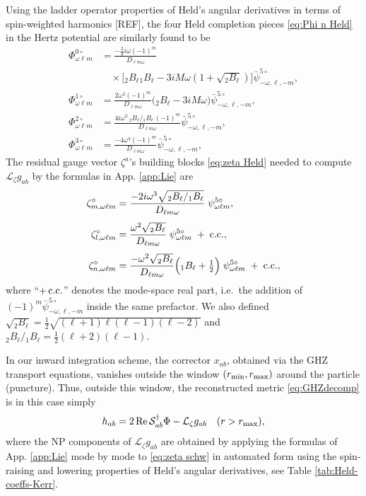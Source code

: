 \documentclass[%
reprint,
 prd,
superscriptaddress,
nofootinbib,
aps,
dvipsnames
]{revtex4-2}
\newcommand{\Lie}{{\mathcal L}}
\newcommand{\emm}{m}
\renewcommand{\S}{{\mathcal S}}
\renewcommand{\Re}{\operatorname{Re}}
\def\l{\ensuremath{\ell}}                          %
\newcommand{\Bco}[1]{{}_{#1}B_{\ell}}                 %
\def\Dlw{D_{\ell\emm\omega}}                %
\newcommand{\PhiN}[1]{\Phi^{#1\circ}}
\newcommand{\zetalM}[1]{\zeta^{\circ}_{l,#1}}
\newcommand{\zetanM}[1]{\zeta^{\circ}_{n,#1}}
\newcommand{\zetamM}[1]{\zeta^{\circ}_{m,#1}}
\begin{document}
Using the ladder operator properties of Held's angular 
derivatives in terms of spin-weighted harmonics [REF], the four Held completion pieces \eqref{eq:Phi n Held} in the Hertz potential are similarly found to be
\begin{subequations}\label{eq:schw closed form}
\begin{align}
\PhiN{0}_{\omega \ell m}
&=
\frac{-\tfrac23 i\omega(-1)^{\emm}}{\Dlw}\\
& \quad \times
\Big[\Bco{2}\Bco{1}-3iM\omega\left(1+\sqrt{\Bco{2}}\right)\Big]
\bar\psi^{5\circ}_{-\omega,\ell,-m},
\label{eq:Phi0 schw}\\[4pt]
\PhiN{1}_{\omega \ell m}
&=
\frac{2\omega^{2}(-1)^{\emm}}{\Dlw}
\Big(\Bco{2}-3iM\omega\Big)
\bar\psi^{5\circ}_{-\omega,\l,-\emm},
\label{eq:Phi1 schw}\\[4pt]
\PhiN{2}_{\omega \ell m}
&=
\frac{4i\omega^{3}\,\Bco{2}/\Bco{1}\,(-1)^{\emm}}{\Dlw}
\bar\psi^{5\circ}_{-\omega,\ell,-m},
\label{eq:Phi2 schw}\\[4pt]
\PhiN{3}_{\omega \ell m}
&=
\frac{-4\omega^{4}(-1)^{\emm}}{\Dlw}
\bar\psi^{5\circ}_{-\omega,\ell,-m},
\label{eq:Phi3 schw}
\end{align}
\end{subequations}
The residual gauge vector $\zeta^a$'s building blocks \eqref{eq:zeta Held} needed to compute $\Lie_\zeta g_{ab}$ by the formulas in App. \ref{app:Lie} are
\begin{subequations}\label{eq:zeta schw}
\begin{align}
\zetamM{\omega \ell m}
&=
\frac{-2i\omega^{3}\sqrt{\Bco{2}/\Bco{1}}}{\Dlw}
\;\psi^{5\circ}_{\omega \ell m},
\label{eq:zeta m schw}\\[4pt]
\zetalM{\omega \ell m}
&=
\frac{\omega^{2}\sqrt{\Bco{2}}}{\Dlw}
\;\psi^{5\circ}_{\omega \ell m}\;+\;{\rm c.c.},
\label{eq:zeta l schw}\\[4pt]
\zetanM{\omega \ell m}
&=
\frac{-\omega^{2}\sqrt{\Bco{2}}}{\Dlw}
\Big(\Bco{1}+\tfrac12\Big)
\;\psi^{5\circ}_{\omega \ell m}\;+\;{\rm c.c.},
\label{eq:zeta n schw}
\end{align}
\end{subequations}
where ``$+\,{\rm c.c.}$'' denotes the mode-space real part,
i.e.\ the addition of $(-1)^{\emm}\bar\psi^{5\circ}_{-\omega,\l,-\emm}$
inside the same prefactor. We also defined $\sqrt{\Bco{2}}=\tfrac12\sqrt{(\ell+1)\ell(\ell-1)(\ell-2)}$ and
$\Bco{2}/\Bco{1} = \tfrac12(\ell+2)(\ell-1)$.

In our inward integration scheme, the corrector $x_{ab}$, obtained via the GHZ transport equations, vanishes outside the window $(r_{\rm min}, r_{\rm max})$ around the particle (puncture). Thus, outside this window, the reconstructed metric \eqref{eq:GHZdecomp} is in this case simply 
\begin{equation}
\label{eq:habadjusted}
    h_{ab} = 2\Re \S^\dagger_{ab} \Phi - \Lie_\zeta g_{ab}
    \quad (r>r_{\rm max}),
\end{equation}
where the NP components of $\Lie_\zeta g_{ab}$ are obtained by applying the formulas of App. \ref{app:Lie}
mode by mode to \eqref{eq:zeta schw} in automated form using the spin-raising and lowering properties of Held's angular derivatives, see Table \ref{tab:Held-coeffs-Kerr}.
\end{document}
